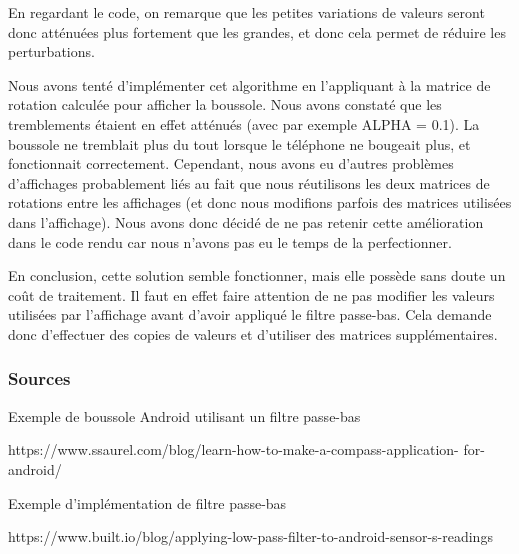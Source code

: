 \documentclass[francais,12pt]{article}
\begin{document}
	En regardant le code, on remarque que les petites variations de valeurs seront donc atténuées plus fortement que les grandes, et donc cela permet de réduire les perturbations.
	
	Nous avons tenté d'implémenter cet algorithme en l'appliquant à la matrice de rotation calculée pour afficher la boussole. Nous avons constaté que les tremblements étaient en effet atténués (avec par exemple ALPHA = 0.1). La boussole ne tremblait plus du tout lorsque le téléphone ne bougeait plus, et fonctionnait correctement. Cependant, nous avons eu d'autres problèmes d'affichages probablement liés au fait que nous réutilisons les deux matrices de rotations entre les affichages (et donc nous modifions parfois des matrices utilisées dans l'affichage). Nous avons donc décidé de ne pas retenir cette amélioration dans le code rendu car nous n'avons pas eu le temps de la perfectionner.
	
	En conclusion, cette solution semble fonctionner, mais elle possède sans doute un coût de traitement. Il faut en effet faire attention de ne pas modifier les valeurs utilisées par l'affichage avant d'avoir appliqué le filtre passe-bas. Cela demande donc d'effectuer des copies de valeurs et d'utiliser des matrices supplémentaires. 
	
	\subsubsection*{Sources}
	Exemple de boussole Android utilisant un filtre passe-bas
	
	https://www.ssaurel.com/blog/learn-how-to-make-a-compass-application-
		for-android/
	
	Exemple d'implémentation de filtre passe-bas
	
	https://www.built.io/blog/applying-low-pass-filter-to-android-sensor-s-readings
	
	
\end{document}
